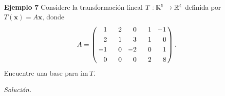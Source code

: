 \subsection{}

\begin{frame}%


\begin{ej}{\textbf{Ejemplo 7}}
	\justifying
	Considere la transformación lineal $T:\mathbb{R}^5\to \mathbb{R}^4$ definida por $T(\mathbf{x})=A\mathbf{x}$,
	donde
	\[
	A = 
	\left(
	\begin{array}{@{\hspace{0.3\tabcolsep}}r@{\hspace{1.5\tabcolsep}}r@{\hspace{1.5\tabcolsep}}r@{\hspace{1.5\tabcolsep}}r@{\hspace{1.5\tabcolsep}}r@{\hspace{0.3\tabcolsep}}}
	 1 & \phantom{-}2 &  0 & \phantom{-}1 & -1 \\[1mm]
	 2 & 1 &  3 & 1 &  0 \\[1mm]
	-1 & 0 & -2 & 0 &  1 \\[1mm]
	 0 & 0 &  0 & 2 &  8 
	\end{array}
	\right).
	\]
	Encuentre una base para $\text{im}\ T$.
\end{ej}
\textit{Solución.}

\end{frame}


\subsection{}

